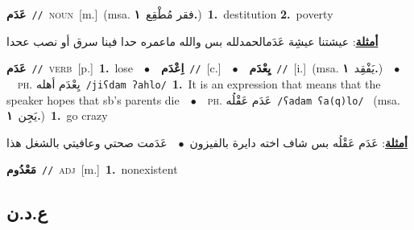 \documentclass[10pt,a4paper,twoside]{article} %
\begin{document}
\begin{multicols}{2}
{\setlength\topsep{0pt}\textbf{\foreignlanguage{arabic}{عَدَم}}\ {\color{gray}\texttt{//}\color{black}}\ \textsc{noun}\ [m.]\ \color{gray}(msa. \foreignlanguage{arabic}{فقر مُطْقِع}~\foreignlanguage{arabic}{\textbf{١.}})\color{black}\ \textbf{1.}~destitution  \textbf{2.}~poverty\  \begin{flushright}\color{gray}\foreignlanguage{arabic}{\textbf{\underline{\foreignlanguage{arabic}{أمثلة}}}: عيشتنا عيشِة عَدَمالحمدلله بس والله ماعمره حدا فينا سرق أو نصب عحدا}\end{flushright}\color{black}} \vspace{2mm}

{\setlength\topsep{0pt}\textbf{\foreignlanguage{arabic}{عَدَم}}\ {\color{gray}\texttt{//}\color{black}}\ \textsc{verb}\ [p.]\ \textbf{1.}~lose\ \ $\bullet$\ \ \setlength\topsep{0pt}\textbf{\foreignlanguage{arabic}{اِعْدَم}}\ {\color{gray}\texttt{//}\color{black}}\ [c.]\ \ $\bullet$\ \ \setlength\topsep{0pt}\textbf{\foreignlanguage{arabic}{يِعْدَم}}\ {\color{gray}\texttt{//}\color{black}}\ [i.]\ \color{gray}(msa. \foreignlanguage{arabic}{يَفْقِد}~\foreignlanguage{arabic}{\textbf{١.}})\color{black}\ \ $\bullet$\ \ \textsc{ph.} \color{gray} \foreignlanguage{arabic}{يِعْدَم أهله}\color{black}\ {\color{gray}\texttt{/{\sffamily jiʕdam ʔahlo}/}\color{black}}\ \textbf{1.}~It is an expression that means that the speaker hopes that sb's parents die\ \ $\bullet$\ \ \textsc{ph.} \color{gray} \foreignlanguage{arabic}{عَدَم عَقْلُه}\color{black}\ {\color{gray}\texttt{/{\sffamily ʕadam ʕa(q)lo}/}\color{black}}\ \color{gray} (msa. \foreignlanguage{arabic}{يَجِن}~\foreignlanguage{arabic}{\textbf{١.}})\color{black}\ \textbf{1.}~go crazy\  \begin{flushright}\color{gray}\foreignlanguage{arabic}{\textbf{\underline{\foreignlanguage{arabic}{أمثلة}}}: عَدَم عَقْلُه بس شاف اخته دايرة بالفيزون\ $\bullet$\ \  عَدَمت صحتي وعافيتي بالشغل هذا}\end{flushright}\color{black}} \vspace{2mm}

{\setlength\topsep{0pt}\textbf{\foreignlanguage{arabic}{مَعْدُوم}}\ {\color{gray}\texttt{//}\color{black}}\ \textsc{adj}\ [m.]\ \textbf{1.}~nonexistent\ } \vspace{2mm}

\vspace{-3mm}
\subsection*{\color{blue}\foreignlanguage{arabic}{ع.د.ن}\color{blue}{}} 


\end{multicols}
\end{document}
